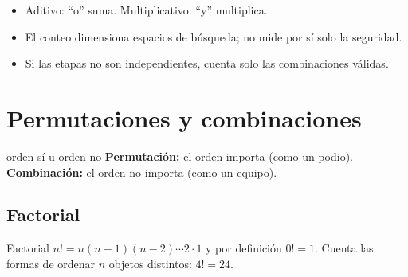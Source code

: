 
\begin{tmresumen}
\begin{itemize}
\item Aditivo: ``o'' suma. Multiplicativo: ``y'' multiplica.
\item El conteo dimensiona espacios de b\'usqueda; no mide por s\'i solo la seguridad.
\item Si las etapas no son independientes, cuenta solo las combinaciones v\'alidas.
\end{itemize}
\end{tmresumen}

\section{Permutaciones y combinaciones}
\label{sec:2-2}

\begin{tmconcepto}{orden s\'i u orden no}
\textbf{Permutaci\'on:} el orden importa (como un podio). \textbf{Combinaci\'on:} el orden no importa (como un equipo).
\end{tmconcepto}


\subsection{Factorial}
\begin{tmdef}{Factorial}
$n!=n(n-1)(n-2)\cdots2\cdot1$ y por definici\'on $0!=1$. Cuenta las formas de ordenar $n$ objetos distintos: $4!=24$.
\end{tmdef}

